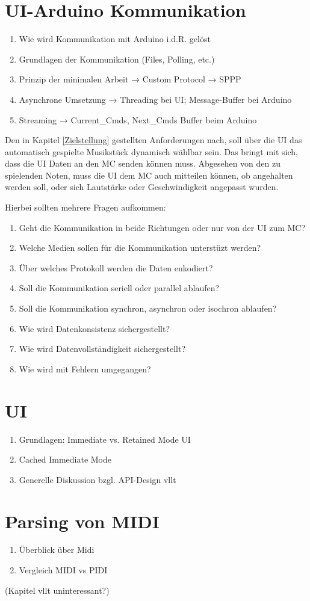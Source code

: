 \section{UI-Arduino Kommunikation} \label{vorgehenSW-SPPP}
\begin{enumerate}
    \item Wie wird Kommunikation mit Arduino i.d.R. gelöst
    \item Grundlagen der Kommunikation (Files, Polling, etc.)
    \item Prinzip der minimalen Arbeit → Custom Protocol → SPPP
    \item Asynchrone Umsetzung → Threading bei UI; Message-Buffer bei Arduino
    \item Streaming → Current\_Cmds, Next\_Cmds Buffer beim Arduino
\end{enumerate}

Den in Kapitel \ref{Zielstellung} gestellten Anforderungen nach, soll über die \ac{UI} das automatisch gespielte Musikstück dynamisch wählbar sein.
Das bringt mit sich, dass die \ac{UI} Daten an den \ac{MC} senden können muss.
Abgesehen von den zu spielenden Noten, muss die \ac{UI} dem \ac{MC} auch mitteilen können, ob angehalten werden soll, oder sich Lautstärke oder Geschwindigkeit angepasst wurden.

Hierbei sollten mehrere Fragen aufkommen:
\begin{enumerate}
    \item Geht die Kommunikation in beide Richtungen oder nur von der \ac{UI} zum \ac{MC}?
    \item Welche Medien sollen für die Kommunikation unterstüzt werden?
    \item Über welches Protokoll werden die Daten enkodiert?
    \item Soll die Kommunikation seriell oder parallel ablaufen?
    \item Soll die Kommunikation synchron, asynchron oder isochron ablaufen?
    \item Wie wird Datenkonsistenz sichergestellt?
    \item Wie wird Datenvollständigkeit sichergestellt?
    \item Wie wird mit Fehlern umgegangen?
\end{enumerate}



\section{UI} \label{vorgehenSW-UI}
\begin{enumerate}
    \item Grundlagen: Immediate vs. Retained Mode UI
    \item Cached Immediate Mode
    \item Generelle Diskussion bzgl. API-Design vllt
\end{enumerate}

\section{Parsing von \ac{MIDI}} \label{vorgehenSW-MIDI}
\begin{enumerate}
    \item Überblick über Midi
    \item Vergleich \ac{MIDI} vs PIDI
\end{enumerate}
(Kapitel vllt uninteressant?)